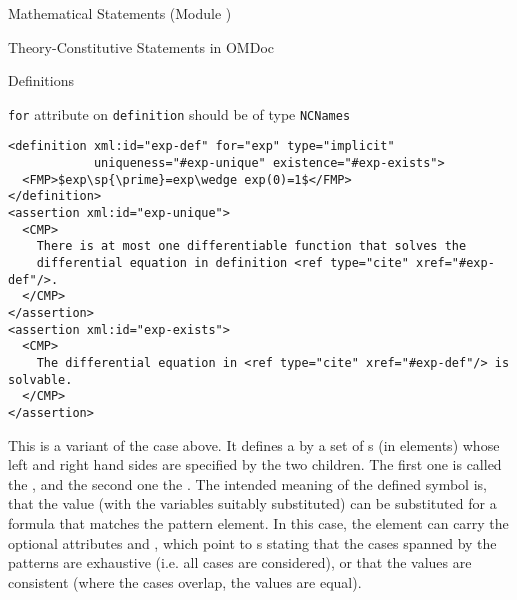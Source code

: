 \begin{tchapter}[id=statements,short=Mathematical Statements]{Mathematical Statements (Module {})}
\begin{tsection}[id=definitions]{Theory-Constitutive Statements in OMDoc}
\begin{tsubsection}[id=definitions]{Definitions}
\begin{description}
\begin{erratum}[reported-by=Michael Kohlhase,date=2009-08-11]{{\texttt{for}} attribute on
    {\texttt{definition}} should be of type {\texttt{NCNames}}}
\begin{lstlisting}[label=lst:exp-def,mathescape,
  caption={An Implicit Definition of the Exponential Function},
  index={definition,assertion,type,uniqueness,existence}]
<definition xml:id="exp-def" for="exp" type="implicit" 
            uniqueness="#exp-unique" existence="#exp-exists">
  <FMP>$exp\sp{\prime}=exp\wedge exp(0)=1$</FMP>
</definition>
<assertion xml:id="exp-unique">
  <CMP>
    There is at most one differentiable function that solves the 
    differential equation in definition <ref type="cite" xref="#exp-def"/>.
  </CMP>
</assertion>
<assertion xml:id="exp-exists">
  <CMP>
    The differential equation in <ref type="cite" xref="#exp-def"/> is solvable.
  </CMP>
</assertion>
\end{lstlisting}
\end{erratum}
\item[{\attval{inductive}{type}{definition}}] This is a variant of the
  {} case above. It defines a
  {} by a set of {s} (in
  {} elements) whose left and right hand sides are specified by the two
  children. The first one is called the {}, and the second one the
  {}. The intended meaning of the defined symbol is, that the value (with the
  variables suitably substituted) can be substituted for a formula that matches the
  pattern element. In this case, the {} element can carry the optional
  attributes {} and
  {}, which point to {}s stating
  that the cases spanned by the patterns are exhaustive (i.e. all cases are considered),
  or that the values are consistent (where the cases overlap, the values are equal).


\end{description}
\end{tsubsection}
\end{tsection}
\end{tchapter}
